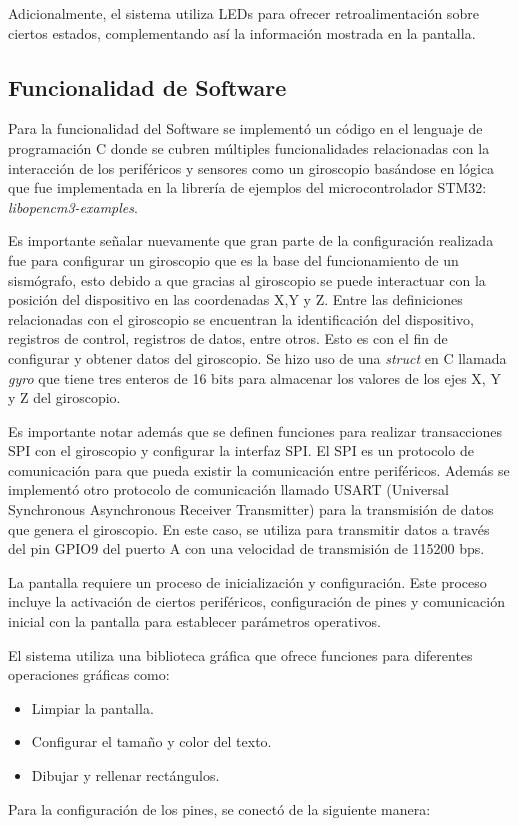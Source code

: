 Adicionalmente, el sistema utiliza LEDs para ofrecer retroalimentación sobre ciertos estados, complementando así la información mostrada en la pantalla.

\newpage

\subsection{Funcionalidad de Software}

Para la funcionalidad del Software se implementó un código en el lenguaje de programación C  donde se cubren múltiples funcionalidades relacionadas con la interacción de los periféricos y sensores como un giroscopio basándose en lógica que fue implementada en la librería de ejemplos del microcontrolador STM32: \textit{libopencm3-examples}.

Es importante señalar nuevamente que gran parte de la configuración realizada fue para configurar un giroscopio que es la base del funcionamiento de un sismógrafo, esto debido a que gracias al giroscopio se puede interactuar con la posición del dispositivo en las coordenadas X,Y y Z. Entre las definiciones relacionadas con el giroscopio se encuentran la identificación del dispositivo, registros de control, registros de datos, entre otros. Esto es con el fin de configurar y obtener datos del giroscopio. Se hizo uso de una \textit{struct} en C llamada \textit{gyro} que tiene tres enteros de 16 bits para almacenar los valores de los ejes X, Y y Z del giroscopio.

Es importante notar además que se definen funciones para realizar transacciones SPI con el giroscopio y configurar la interfaz SPI. El SPI es un protocolo de comunicación para que pueda existir la comunicación entre periféricos. Además se implementó otro protocolo de comunicación llamado USART (Universal Synchronous Asynchronous Receiver Transmitter) para la transmisión de datos que genera el giroscopio. En este caso, se utiliza para transmitir datos a través del pin GPIO9 del puerto A con una velocidad de transmisión de 115200 bps.

La pantalla requiere un proceso de inicialización y configuración. Este proceso incluye la activación de ciertos periféricos, configuración de pines y comunicación inicial con la pantalla para establecer parámetros operativos.

El sistema utiliza una biblioteca gráfica que ofrece funciones para diferentes operaciones gráficas como:
\begin{itemize}
    \item Limpiar la pantalla.
    \item Configurar el tamaño y color del texto.
    \item Dibujar y rellenar rectángulos.
\end{itemize}
Para la configuración de los pines, se conectó de la siguiente manera:

